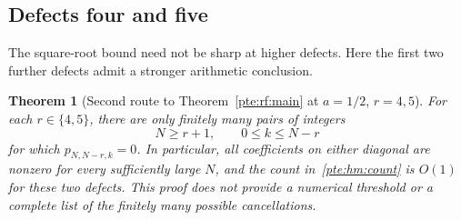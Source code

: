 \documentclass[11pt,a4paper]{article}
\numberwithin{equation}{section}
\newtheorem{theorem}{Theorem}[section]
\theoremstyle{definition}
\theoremstyle{plain}
\begin{document}
\subsection{Defects four and five}
The square-root bound need not be sharp at higher defects. Here the first two further defects admit a stronger arithmetic conclusion.

\begin{theorem}[Second route to Theorem~\ref{pte:rf:main} at $a=1/2$, $r=4,5$]\label{pte:hm:finite}
For each $r\in\{4,5\}$, there are only finitely many pairs of integers
\[
 N\ge r+1,\qquad 0\le k\le N-r
\]
for which $p_{N,N-r,k}=0$. In particular, all coefficients on either diagonal are nonzero for every sufficiently large $N$, and the count in~\eqref{pte:hm:count} is $O(1)$ for these two defects. This proof does not provide a numerical threshold or a complete list of the finitely many possible cancellations.
\end{theorem}
\end{document}
